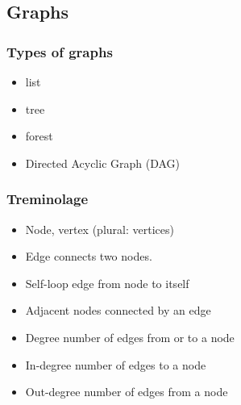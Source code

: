 \begin{multicols}{2}
\subsection{Graphs}
\subsubsection{Types of graphs}
\begin{itemize}
\item list
\item tree
\item forest
\item Directed Acyclic Graph (DAG)  
\end{itemize}

\subsubsection{Treminolage}
\begin{itemize}
\item Node, vertex (plural: vertices)
\item Edge connects two nodes.
\item Self-loop edge from node to itself
\item Adjacent nodes connected by an edge
\item Degree number of edges from or to a node
\item In-degree number of edges to a node
\item Out-degree number of edges from a node
\end{itemize}


\end{multicols}
